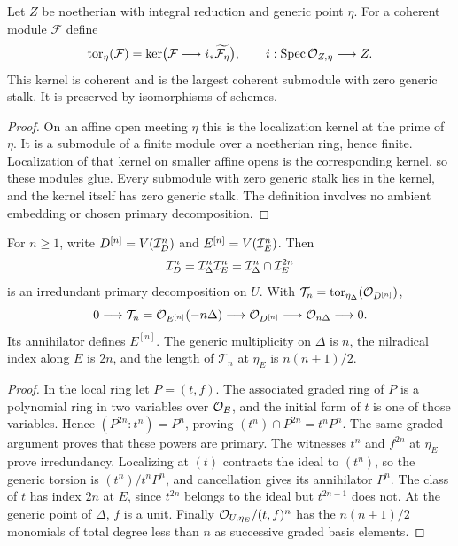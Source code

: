 \begin{lemma}\label{lem:generic-torsion}
Let $Z$ be noetherian with integral reduction and generic point $\eta$.
For a coherent module $\mathcal F$ define
\[
 \operatorname{tor}_{\eta}(\mathcal F)
   =\ker\bigl(\mathcal F\longrightarrow
       i_*\widetilde{\mathcal F_\eta}\bigr),
 \qquad i:\operatorname{Spec}\mathcal O_{Z,\eta}\longrightarrow Z.
\]
This kernel is coherent and is the largest coherent submodule with
zero generic stalk. It is preserved by isomorphisms of schemes.
\end{lemma}
\begin{proof}
On an affine open meeting $\eta$ this is the localization kernel at
the prime of $\eta$. It is a submodule of a finite module over a
noetherian ring, hence finite. Localization of that kernel on smaller
affine opens is the corresponding kernel, so these modules glue.
Every submodule with zero generic stalk lies in the kernel, and the
kernel itself has zero generic stalk. The definition involves no
ambient embedding or chosen primary decomposition.
\end{proof}

\begin{corollary}\label{cor:powers}
For $n\ge1$, write $D^{[n]}=V(\mathcal I_D^n)$ and $E^{[n]}=V(\mathcal I_E^n)$.
Then
\begin{equation}\label{eq:powers}
 \mathcal I_D^n=\mathcal I_\Delta^n\mathcal I_E^n
           =\mathcal I_\Delta^n\cap\mathcal I_E^{2n}
\end{equation}
is an irredundant primary decomposition on $U$. With
$\mathcal T_n=\operatorname{tor}_{\eta_\Delta}(\mathcal O_{D^{[n]}})$,
\begin{equation}\label{eq:power-sequence}
 0\longrightarrow\mathcal T_n=\mathcal O_{E^{[n]}}(-n\Delta)
 \longrightarrow\mathcal O_{D^{[n]}}\longrightarrow\mathcal O_{n\Delta}
 \longrightarrow0.
\end{equation}
Its annihilator defines $E^{[n]}$. The generic multiplicity on
$\Delta$ is $n$, the nilradical index along $E$ is $2n$, and the
length of $\mathcal T_n$ at $\eta_E$ is $n(n+1)/2$.
\end{corollary}
\begin{proof}
In the local ring let $P=(t,f)$. The associated graded ring of $P$
is a polynomial ring in two variables over $\mathcal O_E$, and the initial
form of $t$ is one of those variables. Hence
$(P^{2n}:t^n)=P^n$, proving
$(t^n)\cap P^{2n}=t^nP^n$. The same graded argument proves that these
powers are primary. The witnesses $t^n$ and $f^{2n}$ at $\eta_E$
prove irredundancy. Localizing at $(t)$ contracts the ideal to $(t^n)$,
so the generic torsion is $(t^n)/t^nP^n$, and cancellation gives its
annihilator $P^n$. The class of $t$ has index $2n$ at $E$, since
$t^{2n}$ belongs to the ideal but $t^{2n-1}$ does not. At the generic
point of $\Delta$, $f$ is a unit. Finally
$\mathcal O_{U,\eta_E}/(t,f)^n$ has the $n(n+1)/2$ monomials of total
degree less than $n$ as successive graded basis elements.
\end{proof}

